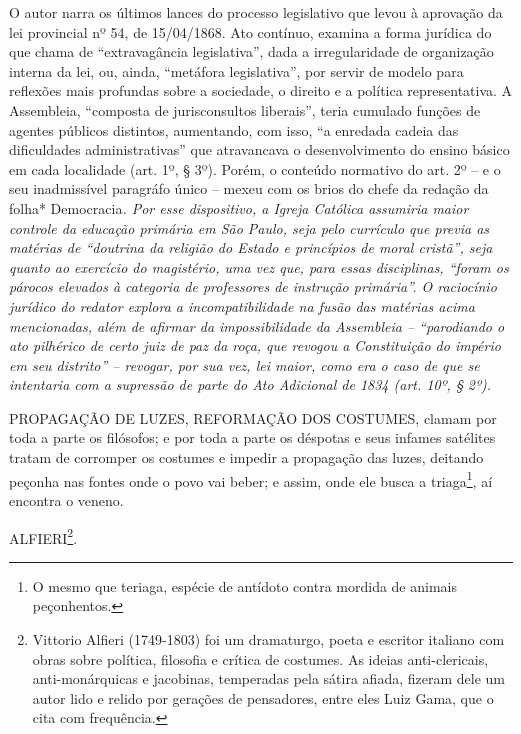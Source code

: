 \begin{didascalia}
O autor narra os últimos lances do processo legislativo que levou à
aprovação da lei provincial nº 54, de 15/04/1868. Ato contínuo, examina
a forma jurídica do que chama de ``extravagância legislativa'', dada a
irregularidade de organização interna da lei, ou, ainda, ``metáfora
legislativa'', por servir de modelo para reflexões mais profundas sobre a
sociedade, o direito e a política representativa. A Assembleia,
``composta de jurisconsultos liberais'', teria cumulado funções de agentes
públicos distintos, aumentando, com isso, ``a enredada cadeia das
dificuldades administrativas'' que atravancava o desenvolvimento do
ensino básico em cada localidade (art. 1º, § 3º). Porém, o conteúdo
normativo do art. 2º -- e o seu inadmissível paragráfo único -- mexeu
com os brios do chefe da redação da folha* Democracia\emph{. Por esse
dispositivo, a Igreja Católica assumiria maior controle da educação
primária em São Paulo, seja pelo currículo que previa as matérias de
``doutrina da religião do Estado e princípios de moral cristã'', seja
quanto ao exercício do magistério, uma vez que, para essas disciplinas,
``foram os párocos elevados à categoria de professores de instrução
primária''. O raciocínio jurídico do redator explora a incompatibilidade
na fusão das matérias acima mencionadas, além de afirmar da
impossibilidade da Assembleia -- ``parodiando o ato pilhérico de certo
juiz de paz da roça, que revogou a Constituição do império em seu
distrito'' -- revogar, por sua vez, lei maior, como era o caso de que se
intentaria com a supressão de parte do Ato Adicional de 1834 (art. 10º,
§ 2º).}
\end{didascalia}

\asterisc{}

PROPAGAÇÃO DE LUZES, REFORMAÇÃO DOS COSTUMES, clamam por toda a parte os
filósofos; e por toda a parte os déspotas e seus infames satélites
tratam de corromper os costumes e impedir a propagação das luzes,
deitando peçonha nas fontes onde o povo vai beber; e assim, onde ele
busca a triaga\footnote{O mesmo que teriaga, espécie de antídoto
  contra mordida de animais peçonhentos.}, aí encontra o veneno.

ALFIERI\footnote{Vittorio Alfieri (1749-1803) foi um dramaturgo, poeta
  e escritor italiano com obras sobre política, filosofia e crítica de
  costumes. As ideias anti-clericais, anti-monárquicas e jacobinas,
  temperadas pela sátira afiada, fizeram dele um autor lido e relido por
  gerações de pensadores, entre eles Luiz Gama, que o cita com
  frequência.}.

